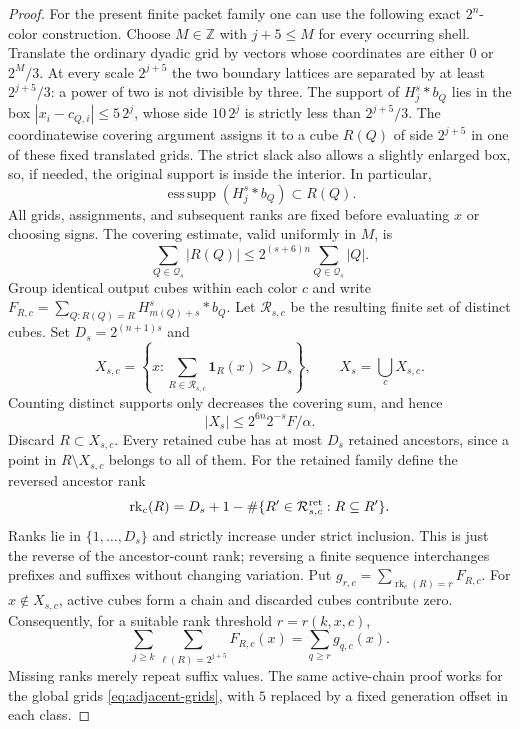 \documentclass[11pt]{article}
\numberwithin{equation}{section}
\theoremstyle{remark}
\theoremstyle{definition}
\begin{document}
\begin{proof}
For the present finite packet family one can use the following exact
$2^n$-color construction.  Choose $M\in\mathbb Z$ with $j+5\le M$ for
every occurring shell.  Translate the ordinary dyadic grid by vectors
whose coordinates are either $0$ or $2^M/3$.  At every scale $2^{j+5}$
the two boundary lattices are separated by at least $2^{j+5}/3$:
a power of two is not divisible by three.  The support of $H_j^s*b_Q$
lies in the box $|x_i-c_{Q,i}|\le5\,2^j$, whose side
$10\,2^j$ is strictly less than $2^{j+5}/3$.
The coordinatewise covering argument assigns it to a cube $R(Q)$ of side
$2^{j+5}$ in one of these fixed translated grids.  The strict slack also
allows a slightly enlarged box, so, if needed, the original support is
inside the interior.  In particular,
\begin{equation}\label{eq:localized-essential-support}
 \operatorname{ess\,supp}(H_j^s*b_Q)\subset R(Q).
\end{equation}
All grids, assignments, and subsequent ranks are fixed before evaluating
$x$ or choosing signs.  The covering estimate, valid uniformly in $M$, is
\[
 \sum_{Q\in\mathcal Q_s}|R(Q)|
 \le2^{(s+6)n}\sum_{Q\in\mathcal Q_s}|Q|.
\]
Group identical output cubes within each color $c$ and write
$F_{R,c}=\sum_{Q:R(Q)=R}H_{m(Q)+s}^s*b_Q$.
Let $\mathcal R_{s,c}$ be the resulting finite set of distinct cubes.
Set $D_s=2^{(n+1)s}$ and
\[
 X_{s,c}=\left\{x:\sum_{R\in\mathcal R_{s,c}}\mathbf1_R(x)>D_s\right\},
 \qquad X_s=\bigcup_cX_{s,c}.
\]
Counting distinct supports only decreases the covering sum, and hence
\begin{equation}\label{eq:Xs}
 |X_s|\le2^{6n}2^{-s}F/\alpha.
\end{equation}
Discard $R\subset X_{s,c}$.  Every retained cube has at most $D_s$
retained ancestors, since a point in $R\setminus X_{s,c}$ belongs to all
of them.  For the retained family define the reversed ancestor rank
\begin{equation}\label{eq:rank-definition}
 \operatorname{rk}_c(R)
 =D_s+1-\#\{R'\in\mathcal R_{s,c}^{\rm ret}:R\subseteq R'\}.
\end{equation}
Ranks lie in $\{1,\ldots,D_s\}$ and strictly increase under strict
inclusion.  This is just the reverse of the ancestor-count rank;
reversing a finite sequence interchanges prefixes and suffixes without
changing variation.  Put $g_{r,c}=\sum_{\operatorname{rk}_c(R)=r}F_{R,c}$.
For $x\notin X_{s,c}$, active cubes form a chain and discarded cubes
contribute zero.  Consequently, for a suitable rank threshold $r=r(k,x,c)$,
\begin{equation}\label{eq:rank-shell-pointwise}
 \sum_{j\ge k}\sum_{\ell(R)=2^{j+5}}F_{R,c}(x)
 =\sum_{q\ge r}g_{q,c}(x).
\end{equation}
Missing ranks merely repeat suffix values.  The same active-chain proof
works for the global grids \eqref{eq:adjacent-grids}, with $5$ replaced
by a fixed generation offset in each class.


\end{proof}
\end{document}
